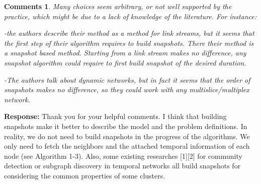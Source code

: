 \documentclass{article}
\newtheorem{Comments}{\textbf{Comments}}
\begin{document}
%


\begin{Comments}
Many choices seem arbitrary, or not well supported by the practice, which might be due to a lack of knowledge of the literature. For instance:

-the authors describe their method as a method for link streams, but it seems that the first step of their algorithm requires to build snapshots. There their method is a snapshot based method. Starting from a link stream makes no difference, any snapshot algorithm could require to first build snapshot of the desired duration.

-The authors talk about dynamic networks, but in fact it seems that the order of snapshots makes no difference, so they could work with any multislice/multiplex network.

\end{Comments}
\noindent \textbf{Response: } Thank you for your helpful comments. I think that building snapshots make it better to describe the model and the problem definitions. In reality, we do not need to build snapshots in the progress of the algorithms. We only need to fetch the neighbors and the attached temporal information of each node (see Algorithm 1-3). Also, some existing researches [1][2] for community detection or subgraph discovery in temporal networks all build snapshots for considering the common properties of some clusters.
\end{document}
